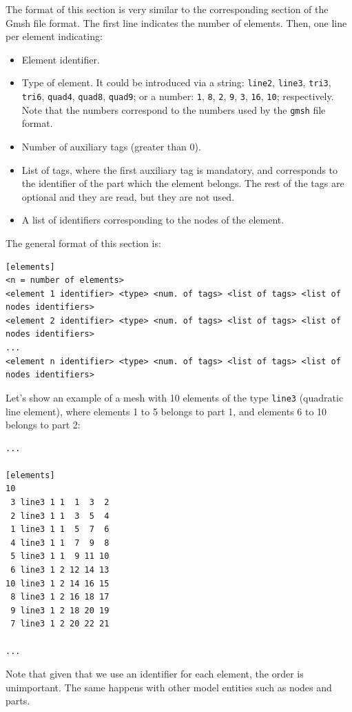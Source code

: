 \documentclass[a4paper,fleqn]{book}
\begin{document}
The format of this section is very similar to the corresponding section of the Gmsh file format. The first line indicates the number of elements. Then, one line per element indicating: 
\begin{itemize}
  \item Element identifier. 
  \item Type of element. It could be introduced via a string: \texttt{line2}, \texttt{line3}, \texttt{tri3}, \texttt{tri6}, \texttt{quad4}, \texttt{quad8}, \texttt{quad9}; or a number: \texttt{1}, \texttt{8}, \texttt{2}, \texttt{9}, \texttt{3}, \texttt{16},  \texttt{10}; respectively. Note that the numbers correspond to the numbers used by the \texttt{gmsh} file format.
  \item Number of auxiliary tags (greater than 0).
  \item List of tags, where the first auxiliary tag is mandatory, and corresponds to the identifier of the part which the element belongs. The rest of the tags are optional and they are read, but they are not used.
  \item A list of identifiers corresponding to the nodes of the element.
\end{itemize}
The general format of this section is:
\begin{Verbatim}[frame=single, fontsize=\small, label={general format of section [elements]}]
[elements]
<n = number of elements>
<element 1 identifier> <type> <num. of tags> <list of tags> <list of nodes identifiers>
<element 2 identifier> <type> <num. of tags> <list of tags> <list of nodes identifiers>
...
<element n identifier> <type> <num. of tags> <list of tags> <list of nodes identifiers>
\end{Verbatim} 
Let's show an example of a mesh with 10 elements of the type \texttt{line3} (quadratic line element), where elements 1 to 5 belongs to part 1, and elements 6 to 10 belongs to part 2:
\begin{Verbatim}[frame=single, fontsize=\small, label=input.dat]
...

[elements]
10
 3 line3 1 1  1  3  2
 2 line3 1 1  3  5  4
 1 line3 1 1  5  7  6
 4 line3 1 1  7  9  8
 5 line3 1 1  9 11 10
 6 line3 1 2 12 14 13
10 line3 1 2 14 16 15
 8 line3 1 2 16 18 17
 9 line3 1 2 18 20 19
 7 line3 1 2 20 22 21

...
\end{Verbatim}
Note that given that we use an identifier for each element, the order is unimportant. The same happens with other model entities such as nodes and parts.
\end{document}
